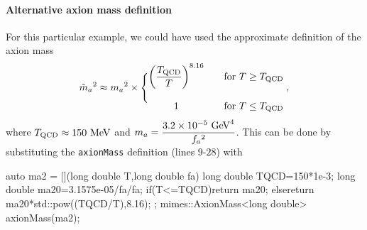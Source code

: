 \documentclass[11pt,a4paper]{article}
\begin{document}
\paragraph{Alternative axion mass definition}
%
For this particular example, we could have used the approximate definition of the axion mass
%
\begin{equation}
	\tilde m_{a}{}^2 \approx m_{a}{}^2 \times \Bigg\{ 
	\begin{matrix}
	\left( \dfrac{T_{\rm QCD}}{T} \right)^{8.16} & \quad \text{for } T\geq T_{\rm QCD} 
	\\ \\
	1 & \quad \text{for } T\leq T_{\rm QCD}
\end{matrix} \;,
	\label{eq:axM_approx}
\end{equation}
%
where $T_{\rm QCD}  \approx 150~{\rm MeV}$ and $m_{a}{}=\dfrac{3.2 \times 10^{-5} ~{\rm GeV}^4}{f_{a}{}^2}$. This can be done by substituting the {\tt axionMass} definition (lines $9$-$28$) with 
%
\begin{cpp}
	auto ma2 = [](long double T,long double fa){
	    long double TQCD=150*1e-3;
	    long double ma20=3.1575e-05/fa/fa;
	    if(T<=TQCD){return ma20;}
	    else{return ma20*std::pow((TQCD/T),8.16);}
	};
	mimes::AxionMass<long double> axionMass(ma2);
\end{cpp}
\end{document}
